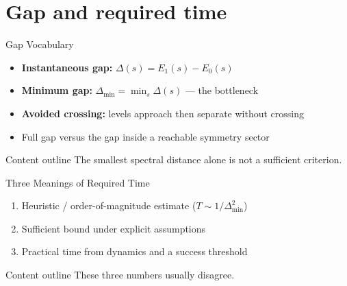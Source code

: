 \documentclass[
	11pt,
	aspectratio=169,
	compress,
]{beamer}
\newcommand{\outlinebox}[1]{%
	\vspace{0.25em}%
	\begin{block}{Content outline}
		#1
	\end{block}
}
\begin{document}
\section{Gap and required time}
\begin{frame}{Gap Vocabulary}
	\begin{itemize}
		\item \textbf{Instantaneous gap:} $\Delta(s)=E_1(s)-E_0(s)$
		\item \textbf{Minimum gap:} $\Delta_{\min}=\min_s\Delta(s)$ --- the bottleneck
		\item \textbf{Avoided crossing:} levels approach then separate without crossing
		\item Full gap versus the gap inside a reachable symmetry sector
	\end{itemize}
	\outlinebox{The smallest spectral distance alone is not a sufficient criterion.}
\end{frame}

\begin{frame}{Three Meanings of Required Time}
	\begin{enumerate}
		\item Heuristic / order-of-magnitude estimate ($T\sim 1/\Delta_{\min}^{2}$)
		\item Sufficient bound under explicit assumptions
		\item Practical time from dynamics and a success threshold
	\end{enumerate}
	\outlinebox{These three numbers usually disagree.}
\end{frame}
\end{document}
